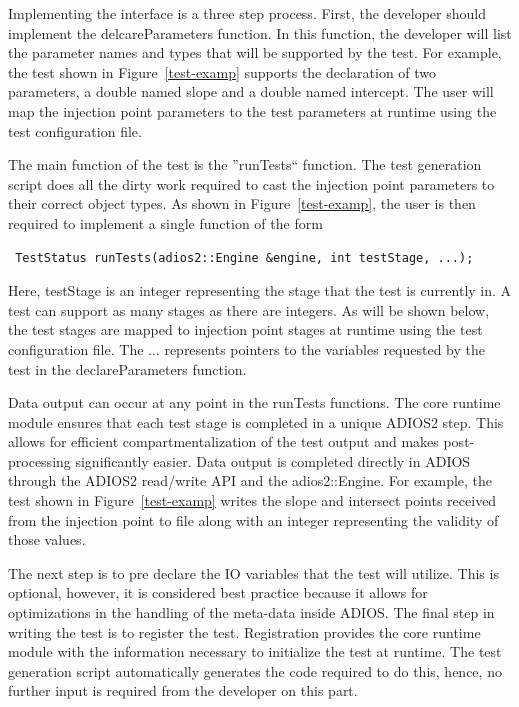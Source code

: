 Implementing the interface is a three step process. First, the developer should implement the delcareParameters function. In this function, the developer will
list the parameter names and types that will be supported by the test. For example, the test shown in Figure~\ref{test-examp} supports the declaration of 
two parameters, a double named slope and a double named intercept. The user will map the injection point parameters to the test parameters at runtime using 
the test configuration file.

The main function of the test is the ''runTests`` function. The test generation script does all the dirty work required to cast the injection point parameters
to their correct object types. As shown in Figure~\ref{test-examp}, the user is then required to implement a single function of the form
\begin{verbatim}
 TestStatus runTests(adios2::Engine &engine, int testStage, ...);
\end{verbatim}

Here, testStage is an integer representing the stage that the test is currently in. A test can support as many stages as there are integers. As will be shown below, the test 
stages are mapped to injection point stages at runtime using the test configuration file. The ... represents pointers to the variables requested by the test in the 
declareParameters function. 

Data output can occur at any point in the runTests functions. The core runtime module ensures that each test stage is completed in a unique ADIOS2 step. This allows for efficient 
compartmentalization of the test output and makes post-processing significantly easier. Data output is completed directly in ADIOS through the 
ADIOS2 read/write API and the adios2::Engine. For example, the test shown in Figure~\ref{test-examp} writes the slope and intersect points received from the injection point
to file along with an integer representing the validity of those values. 

The next step is to pre declare the IO variables that the test will utilize. This is optional, however, it is considered best practice because it allows for optimizations 
in the handling of the meta-data inside ADIOS. The final step in writing the test is to register the test. Registration provides the core runtime module with the information 
necessary to initialize the test at runtime. The test generation script automatically generates the code required to do this, 
hence, no further input is required from the developer on this part. 

